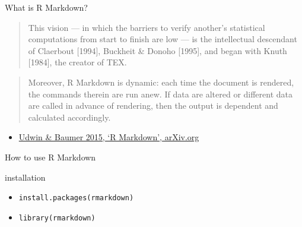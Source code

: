 \documentclass[ignorenonframetext,]{beamer}
\begin{document}
\begin{frame}{What is R Markdown?}

\begin{quote}
This vision --- in which the barriers to verify another's statistical
computations from start to finish are low --- is the intellectual
descendant of Claerbout {[}1994{]}, Buckheit \& Donoho {[}1995{]}, and
began with Knuth {[}1984{]}, the creator of TEX.
\end{quote}

\begin{quote}
Moreover, R Markdown is dynamic: each time the document is rendered, the
commands therein are run anew. If data are altered or different data are
called in advance of rendering, then the output is dependent and
calculated accordingly.
\end{quote}

\begin{itemize}[<+->]
\itemsep1pt\parskip0pt
\item
  \href{http://arxiv.org/abs/1501.01613}{Udwin \& Baumer 2015, `R
  Markdown', arXiv.org}
\end{itemize}

\end{frame}

\begin{frame}{How to use R Markdown}

\begin{block}{installation}

\begin{itemize}[<+->]
\itemsep1pt\parskip0pt
\item
  \texttt{install.packages(\textquotesingle{}rmarkdown\textquotesingle{})}
\item
  \texttt{library(rmarkdown)}
\end{itemize}

\end{block}

\end{frame}
\end{document}
